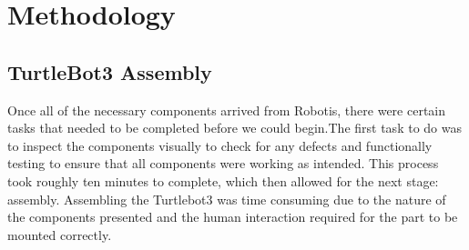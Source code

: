 \documentclass[12pt]{report}
\begin{document}
\chapter{Methodology}
\section{TurtleBot3 Assembly}
Once all of the necessary components arrived from Robotis, there were certain tasks that needed to be completed before we could begin.The first task to do was to inspect the components visually to check for any defects and functionally testing to ensure that all components were working as intended. This process took roughly ten minutes to complete, which then allowed for the next stage: assembly. Assembling the Turtlebot3 was time consuming due to the nature of the components presented and the human interaction required for the part to be mounted correctly.\par
\end{document}
